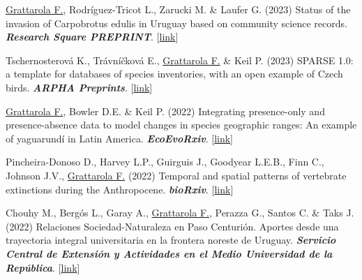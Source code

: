 \documentclass[9pt]{developercv} %
\begin{document}
\begin{etaremune}

\item \underline{Grattarola F.}, Rodríguez-Tricot L., Zarucki M. \& Laufer G. (2023) Status of the invasion of Carpobrotus edulis in Uruguay based on community science records. \textit{\textbf{Research Square PREPRINT}}. [\href{https://doi.org/10.21203/rs.3.rs-3185397/v1}{link}]

\item Tschernosterová K., Trávníčková E., \underline{Grattarola F.} \& Keil P. (2023) SPARSE 1.0: a template for databases of species inventories, with an open example of Czech birds. \textit{\textbf{ARPHA Preprints}}. [\href{https://doi.org/10.3897/arphapreprints.e110098}{link}]

\item \underline{Grattarola F.}, Bowler D.E. \& Keil P. (2022) Integrating presence-only and presence-absence data to model changes in species geographic ranges: An example of yaguarundí in Latin America. \textit{\textbf{EcoEvoRxiv}}. [\href{https://doi.org/10.32942/osf.io/67c4u}{link}]

\item Pincheira-Donoso D., Harvey L.P., Guirguis J., Goodyear L.E.B., Finn C., Johnson J.V., \underline{Grattarola F.} (2022) Temporal and spatial patterns of vertebrate extinctions during the Anthropocene. \textit{\textbf{bioRxiv}}. [\href{https://doi.org/10.1101/2022.05.05.490605}{link}]

\end{etaremune}


\begin{etaremune}

\item Chouhy M., Bergós L., Garay A., \underline{Grattarola F.}, Perazza G., Santos C. \& Taks J. (2022) Relaciones Sociedad-Naturaleza en Paso Centurión. Aportes desde una trayectoria integral universitaria en la frontera noreste de Uruguay. \textit{\textbf{Servicio Central de Extensión y Actividades en el Medio Universidad de la República}}. [\href{https://udelar.edu.uy/retema/wp-content/uploads/sites/30/2022/09/relaciones_sociedad-naturaleza_en_paso_centurion-comprimido-1.pdf}{link}]

\end{etaremune}

\hfill 
\end{document}

